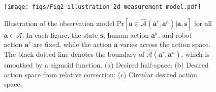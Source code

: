 \begin{figure}[t]
	\centering
	\texttt{[image: figs/Fig2\_illustration\_2d\_measurement\_model.pdf]}
	\caption{ Illustration of the observation model $\text{Pr} [\bm a \in \hat {\mathcal{A}} {(\bm a^r\!\!,\! \bm a^h)}| \bm a , \bm s]$ for all $\bm a \in \! \mathcal{ A}$. 
    In each figure, the state $\bm s$, human action $\bm a^h$, and robot action $\bm a^r$ are fixed, while the action $\bm a$ varies across the action space. The black dotted line denotes the boundary of $\hat {\mathcal{A}} {(\bm a^r\!\!, \!\bm a^h)}$, which is smoothed by a sigmoid function. (a) Desired half-space; (b) Desired action space from relative correction; (c) Circular desired action space.}
	\label{fig:Fig2_illustration_2d_measurement_model}
\end{figure}



